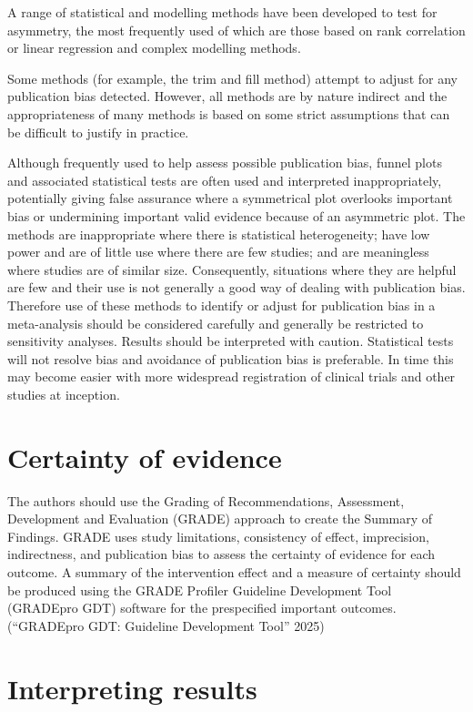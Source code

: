 \documentclass[
  11pt,
  a4paper,
  DIV=11,
  numbers=noendperiod]{scrreprt}
\begin{document}
A range of statistical and modelling methods have been developed to test
for asymmetry, the most frequently used of which are those based on rank
correlation or linear regression and complex modelling methods.

Some methods (for example, the trim and fill method) attempt to adjust
for any publication bias detected. However, all methods are by nature
indirect and the appropriateness of many methods is based on some strict
assumptions that can be difficult to justify in practice.

Although frequently used to help assess possible publication bias,
funnel plots and associated statistical tests are often used and
interpreted inappropriately, potentially giving false assurance where a
symmetrical plot overlooks important bias or undermining important valid
evidence because of an asymmetric plot. The methods are inappropriate
where there is statistical heterogeneity; have low power and are of
little use where there are few studies; and are meaningless where
studies are of similar size. Consequently, situations where they are
helpful are few and their use is not generally a good way of dealing
with publication bias. Therefore use of these methods to identify or
adjust for publication bias in a meta-analysis should be considered
carefully and generally be restricted to sensitivity analyses. Results
should be interpreted with caution. Statistical tests will not resolve
bias and avoidance of publication bias is preferable. In time this may
become easier with more widespread registration of clinical trials and
other studies at inception.

\section{Certainty of evidence}\label{certainty-of-evidence-1}

The authors should use the Grading of Recommendations, Assessment,
Development and Evaluation (GRADE) approach to create the Summary of
Findings. GRADE uses study limitations, consistency of effect,
imprecision, indirectness, and publication bias to assess the certainty
of evidence for each outcome. A summary of the intervention effect and a
measure of certainty should be produced using the GRADE Profiler
Guideline Development Tool (GRADEpro GDT) software for the prespecified
important outcomes. ({``GRADEpro GDT: Guideline Development Tool''}
2025)

\section{Interpreting results}\label{interpreting-results}
\end{document}
